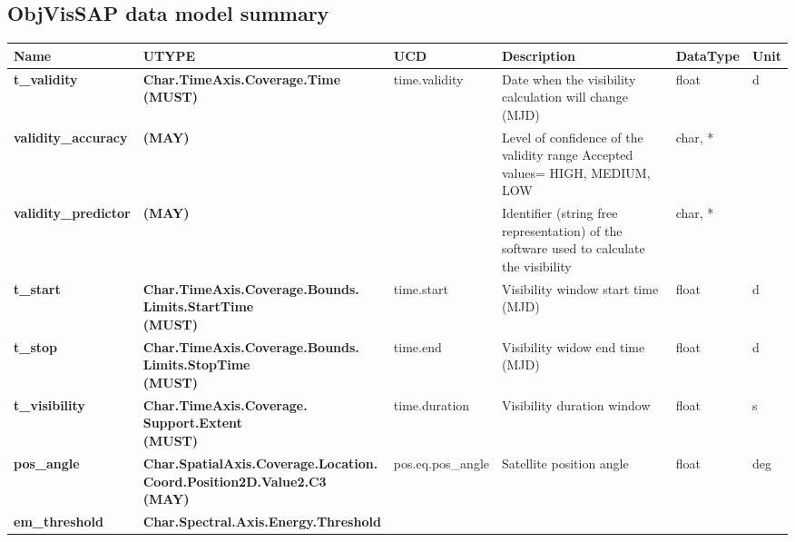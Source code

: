 \documentclass[11pt,a4paper]{ivoatex/ivoa}
\begin{document}
\begin{appendices}
\section{ObjVisSAP data model summary}
\FloatBarrier
\begin{table}[h]
\tiny
\centering
\begin{adjustbox}{angle=90}
\begin{tabular}{|p{25mm}|p{50mm}|p{20mm}|p{40mm}|p{15mm}|p{10mm}|}
\hline
Name & UTYPE & UCD & Description & DataType & Unit \\
\hline
\textbf{t\_validity} & \textbf{Char.TimeAxis.Coverage.Time  \newline
(MUST)} &
time.validity & Date when the \newline
visibility calculation will change (MJD) &
float & d \\
\hline
\textbf{validity\_accuracy} & \textbf{(MAY)} & & Level of confidence
of the validity range \newline
Accepted values= HIGH, MEDIUM, LOW & char, * & \\
\hline
\textbf{validity\_predictor} & \textbf{(MAY)} & & Identifier (string
free representation) of the software used to calculate the visibility &
char, * & \\
\hline
\textbf{t\_start} & \textbf{
Char.TimeAxis.Coverage.Bounds. \newline
Limits.StartTime  \newline
(MUST)} & time.start &
Visibility window start time (MJD) & float & d \\
\hline
\textbf{t\_stop} & \textbf{
Char.TimeAxis.Coverage.Bounds. \newline
Limits.StopTime \newline
(MUST)} & time.end &
Visibility widow end time (MJD) & float & d \\
\hline
\textbf{t\_visibility} & \textbf{
Char.TimeAxis.Coverage. \newline
Support.Extent  \newline
(MUST)} & time.duration &
Visibility duration window & float & s \\
\hline
\textbf{pos\_angle} & \textbf{
Char.SpatialAxis.Coverage.Location. \newline
Coord.Position2D.Value2.C3  \newline
(MAY)} &
pos.eq.pos\_angle & Satellite position angle & float & deg \\
\hline
\textbf{em\_threshold} & \textbf{
Char.Spectral.Axis.Energy.Threshold \newline
}
\end{tabular}
\end{adjustbox}
\end{table}
\end{appendices}
\end{document}

